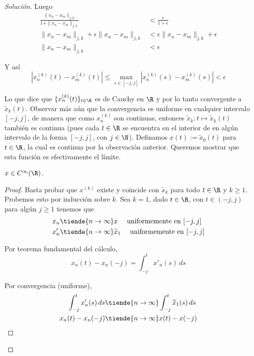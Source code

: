 \documentclass[duedate = 11 de Septiembre, 
			ramo = An\'alisis Funcional, 
			doctype = Tarea 1,
			semester = 2,
			year = 2017]{tarea}
\begin{document}
\begin{proof}[Solución]
Luego
	\begin{align*}
		\frac{\|x_{n} - x_{m}\|_{j,k}}{1 + \|x_{n} - x_{m}\|_{j,k}}
			&<	\frac{\epsilon}{1+\epsilon}	\\
		\|x_{n} - x_{m}\|_{j,k} + \epsilon \|x_{n} - x_{m}\|_{j,k}
			&<	\epsilon \|x_{n} - x_{m}\|_{j,k} + \epsilon	\\
		\|x_{n} - x_{m}\|_{j,k}
			&<	\epsilon
	\end{align*}
	
Y así
	$$|x_{n}^{(k)}(t) - x_{m}^{(k)}(t)| \leq \max_{s \in [-j,j]} |x_{n}^{(k)}(s) - x_{m}^{(k)}(s)| < \epsilon$$

Lo que dice que $\{x_{n}^{(k)}(t)\}_{t \in \R}$ es de Cauchy en $\R$ y por lo tanto convergente a $\widetilde{x}_{k}(t)$. Observar más aún que la convergencia es uniforme en cualquier intervalo $[-j,j]$, de manera que como $x_{n}^{(k)}$ son continuas, entonces $\widetilde{x}_{k}: t \mapsto \widetilde{x}_{k}(t)$ también es continua (pues cada $t \in \R$ se encuentra en el interior de en algún intervalo de la forma $[-j,j]$, con $j \in \N$). Definamos $x(t) := \widetilde{x}_{0}(t)$ para $t \in \R$, la cual es continua por la observación anterior. Queremos mostrar que esta función es efectivamente el límite.
	\begin{afirmacion}
		\item $x \in C^{\infty}(\R)$.
		
		\begin{proof} Basta probar que $x^{(k)}$ existe y coincide con $\widetilde{x}_{k}$ para todo $t \in \R$ y $k \geq 1$. Probemos esto por inducción sobre $k$. Sea $k = 1$, dado $t \in \R$, con $t \in (-j,j)$ para algún $j \geq 1$ tenemos que
			\begin{align*}
				x_{n}		&\tiende{n \to \infty} x			\quad	\text{ uniformemente en } [-j,j]	\\
				x'_{n}	&\tiende{n \to \infty} \widetilde{x}_{1}	\quad	\text{ uniformemente en } [-j,j]
			\end{align*}
		
		Por teorema fundamental del cálculo,
			$$x_{n}(t) - x_{n}(-j) = \int_{-j}^{t} x'_{n}(s) \, ds$$
		
		Por convergencia (uniforme),
			\begin{align*}
				\int_{-j}^{t} x'_{n}(s) \, ds 
					&\tiende{n \to \infty}	\int_{-j}^{t} \widetilde{x}_{1}(s) \, ds	\\
				x_{n}(t) - x_{n}(-j)
					&\tiende{n \to \infty}	x(t) - x(-j)
			\end{align*}
		

\end{proof}
\end{afirmacion}
\end{proof}
\end{document}
